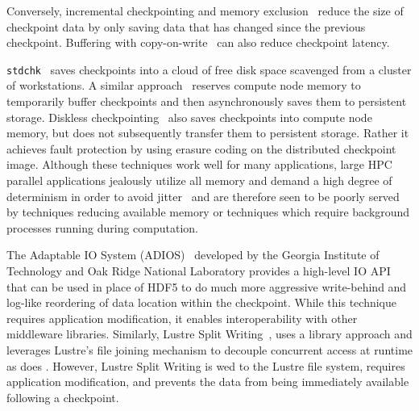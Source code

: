 
Conversely, incremental checkpointing and memory
exclusion~\cite{pcl:99:me,pxn:95:scd} reduce the size of checkpoint data by
only saving data that has changed since the previous checkpoint.  Buffering
with copy-on-write~\cite{li-298215} can also reduce checkpoint latency.




{\tt stdchk}~\cite{stdchk} saves checkpoints into a cloud of free disk space
scavenged from a cluster of workstations.  A similar
approach~\cite{aggregate-memory} reserves compute node memory to temporarily
buffer checkpoints and then asynchronously saves them to persistent storage.
Diskless checkpointing~\cite{diskless} also  
saves checkpoints into compute node memory, but does not subsequently transfer
them to persistent storage.  Rather it achieves fault protection by using erasure 
coding on the distributed checkpoint image. 
Although these techniques work well for many applications, large HPC parallel
applications jealously utilize all memory and demand a high degree of
determinism in order to avoid jitter~\cite{DusseauPhd98} and are therefore seen
to be poorly served by techniques reducing available memory or techniques which
require background processes running during computation.

The Adaptable IO System (ADIOS)~\cite{adios} developed by the Georgia Institute
of Technology and Oak Ridge National Laboratory provides a high-level IO API
that can be used in place of HDF5 to do much more aggressive write-behind and
log-like reordering of data location within the checkpoint. While this technique
requires application modification, it enables interoperability with other
middleware libraries.  Similarly, Lustre Split Writing~\cite{lsw}, uses a 
library approach and leverages Lustre's file joining mechanism to decouple
concurrent access at runtime as does \plfs.  However, Lustre Split Writing is
wed to the Lustre file system, requires application modification, and prevents
the data from being immediately available following a checkpoint.

